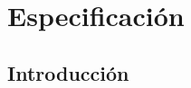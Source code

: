%
%
%
%
%
%
%
%
%
%


\begin{FraseCelebre}
\begin{Frase}
\end{Frase}
\begin{Fuente}
\end{Fuente}
\end{FraseCelebre}


\chapter{Especificaci\'on}
\label{cap3}
\label{cap:especificacion}

\section{Introducci\'on}
\label{cap3:sec:intro}

